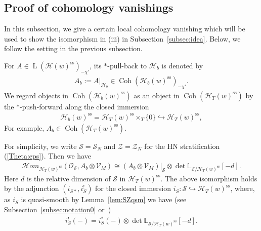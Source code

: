 \documentclass[11pt,oneside,a4paper,mathscr]{amsart}
\theoremstyle{definition}
\newcommand{\cS}{\mathcal{S}}
\newcommand{\LL}{\operatorname{L}}
\newcommand{\cH}{\mathcal{H}}
\newcommand{\cHom}{\mathcal{H}om}
\newcommand{\Coh}{\operatorname{Coh}}
\begin{document}
\subsection{Proof of cohomology vanishings}\label{subsec:pfvanish}
In this subsection, we give a certain local cohomology vanishing which 
will be used to show the isomorphism in (iii) in Subsection~\ref{subsec:idea}. 
Below, we follow the setting in the previous subsection. 

 For $A \in \LL(\cH(w)^{\mathrm{ss}})_{-\chi'}$, its $*$-pull-back to $\cH_b$ is denoted by 
    \begin{align*}A_b:=A|_{\cH_b} \in \Coh(\cH_b(w)^{\mathrm{ss}})_{-\chi'}.
    \end{align*}
    We regard objects in $\Coh(\cH_b(w)^{\mathrm{ss}})$ as an object in $\Coh(\cH_T(w)^{\mathrm{ss}})$
    by the $*$-push-forward along the closed immersion \begin{align*}\cH_b(w)^{\mathrm{ss}}=\cH_T(w)^{\mathrm{ss}}\times_T \{0\}\hookrightarrow \cH_T(w)^{\mathrm{ss}},
    \end{align*}
    For example, $A_b \in \Coh(\cH_T(w)^{\mathrm{ss}})$.

    For simplicity, we write $\cS=\cS_N$ and $\mathcal{Z}=\mathcal{Z}_N$
    for the HN stratification (\ref{Theta:eps}). 
Then we have
\begin{align}
    \label{show:zero}
    \cHom_{\cH_T(w)^{\mathrm{ss}}}(\mathcal{O}_{\cS}, A_b \otimes \mathcal{V}_M)
    \cong (A_b \otimes \mathcal{V}_M)|_{\cS}\otimes \det \mathbb{L}_{\cS/\cH_T(w)^{\mathrm{ss}}}[-d].
\end{align}
Here $d$ is the relative dimension of $\cS$ in $\cH_T(w)^{\mathrm{ss}}$. 
The above isomorphism holds by the adjunction $(i_{S*}, i_{S}^{!})$
for the closed immersion $i_S \colon \cS \hookrightarrow \cH_T(w)^{\mathrm{ss}}$, where, as $i_S$ is quasi-smooth by Lemma~\ref{lem:SZqsm}
 we have (see Subsection~\ref{subsec:notation0} or~\cite[Proposition~7.3.8]{MR3136100})
 \begin{align*}
     i_S^!(-)=i_S^*(-) \otimes \det \mathbb{L}_{\cS/\cH_T(w)^{\mathrm{ss}}}[-d].
 \end{align*}
\end{document}
